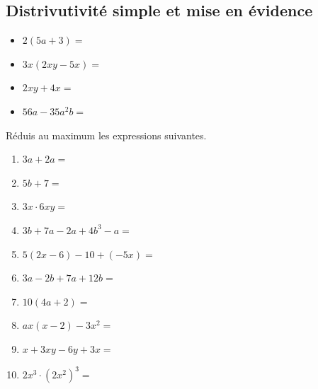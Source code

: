 \documentclass[../../syllabus_2.tex]{subfiles}
\begin{document}
\subsection{Distrivutivité simple et mise en évidence}
\begin{enumerate}
\exemples
\begin{itemize}[cols=2, label=]
  \item $2\left(5a+3\right)=$
  \item $3x\left(2xy - 5x\right)=$
\end{itemize}

\exemples
\begin{itemize}[cols=2, label=]
  \item $2xy+4x=$
  \item $56a - 35a^2b=$
\end{itemize}
\end{enumerate} 


\newpage
\begin{exercise}
  Réduis au maximum les expressions suivantes.
  \begin{enumerate}[cols=2, itemsep=1cm]
    \item  $3a+2a=$
    \item  $5b+7=$
    \item  $3x \cdot 6xy=$
    \item  $3b+7a-2a+4b^3-a=$
    \item  $5(2x - 6)- 10 + (-5x)=$
    \item  $3a-2b+7a+12b=$
    \item  $10\left(4a+2\right)=$
    \item  $ax\left(x-2\right) -3x^2=$
    \item  $x+3xy-6y+3x=$
    \item  $2x^3 \cdot (2x^2)^3=$
  \end{enumerate}
\end{exercise}
\vspace*{1cm}
\end{document}
